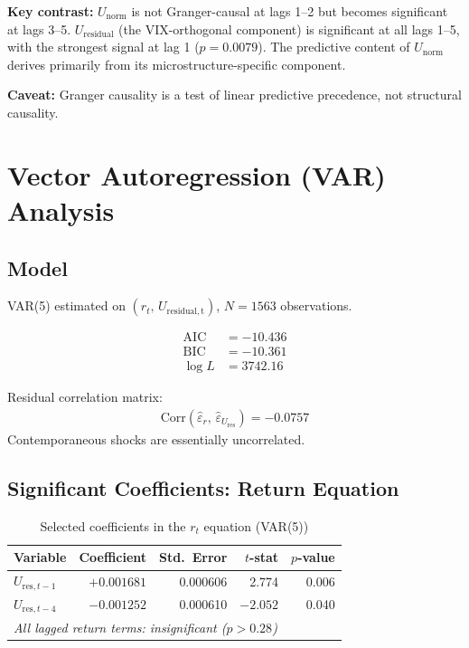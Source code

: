 \documentclass[11pt]{article}
\begin{document}
\textbf{Key contrast:} $U_\mathrm{norm}$ is not Granger-causal at lags 1--2 but becomes significant at lags 3--5. $U_\mathrm{residual}$ (the VIX-orthogonal component) is significant at all lags 1--5, with the strongest signal at lag 1 ($p = 0.0079$). The predictive content of $U_\mathrm{norm}$ derives primarily from its microstructure-specific component.

\textbf{Caveat:} Granger causality is a test of linear predictive precedence, not structural causality.

\section{Vector Autoregression (VAR) Analysis}

\subsection{Model}

VAR(5) estimated on $(r_t,\, U_\mathrm{residual,t})$, $N = 1563$ observations.

\begin{align}
    \mathrm{AIC} &= -10.436 \\
    \mathrm{BIC} &= -10.361 \\
    \log L &= 3742.16
\end{align}

Residual correlation matrix:
\begin{align}
    \mathrm{Corr}(\hat{\varepsilon}_{r},\, \hat{\varepsilon}_{U_\mathrm{res}}) = -0.0757
\end{align}
Contemporaneous shocks are essentially uncorrelated.

\subsection{Significant Coefficients: Return Equation}

\begin{table}[htbp]
\centering
\caption{Selected coefficients in the $r_t$ equation (VAR(5))}
\begin{tabular}{lrrrr}
\toprule
Variable & Coefficient & Std.\ Error & $t$-stat & $p$-value \\
\midrule
$U_{\mathrm{res}, t-1}$ & $+0.001681$ & 0.000606 & 2.774 & 0.006 \\
$U_{\mathrm{res}, t-4}$ & $-0.001252$ & 0.000610 & $-2.052$ & 0.040 \\
\midrule
\multicolumn{5}{l}{\textit{All lagged return terms: insignificant ($p > 0.28$)}} \\
\bottomrule
\end{tabular}
\end{table}
\end{document}
